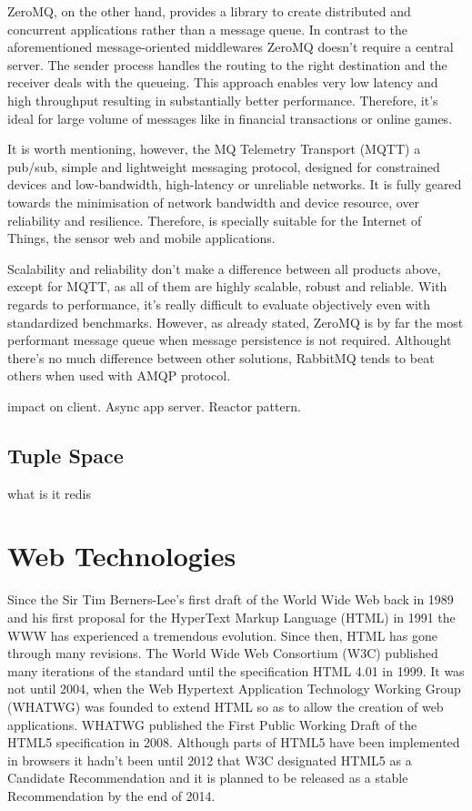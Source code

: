 ZeroMQ, on the other hand, provides a library to create distributed and concurrent applications rather than a message queue. In contrast to the aforementioned message-oriented middlewares ZeroMQ doesn't require a central server. The sender process handles the routing to the right destination and the receiver deals with the queueing. This approach enables very low latency and high throughput resulting in substantially better performance. Therefore, it's ideal for large volume of messages like in financial transactions or online games.

It is worth mentioning, however, the MQ Telemetry Transport (MQTT) a pub/sub, simple and lightweight messaging protocol, designed for constrained devices and low-bandwidth, high-latency or unreliable networks. It is fully geared towards the minimisation of network bandwidth and device resource, over reliability and resilience. Therefore, is specially suitable for the Internet of Things, the sensor web and mobile applications.

Scalability and reliability don't make a difference between all products above, except for MQTT, as all of them are highly scalable, robust and reliable. With regards to performance, it's really difficult to evaluate objectively even with standardized benchmarks. However, as already stated, ZeroMQ is by far the most performant message queue when message persistence is not required. Althought there's no much difference between other solutions, RabbitMQ tends to beat others when used with AMQP protocol.

impact on client. Async app server. Reactor pattern.

\subsection{Tuple Space}
what is it
redis

\section{Web Technologies}

Since the Sir Tim Berners-Lee's first draft of the World Wide Web back in 1989 and his first proposal for the HyperText Markup Language (HTML) \cite{HTMLtags} in 1991 the WWW has experienced a tremendous evolution. Since then, HTML has gone through many revisions. The World Wide Web Consortium (W3C) published many iterations of the standard until the specification HTML 4.01 in 1999. It was not until 2004, when the Web Hypertext Application Technology Working Group (WHATWG) was founded to extend HTML so as to allow the creation of web applications. WHATWG published the First Public Working Draft of the HTML5 specification in 2008. Although parts of HTML5 have been implemented in browsers it hadn't been until 2012 that W3C designated HTML5 as a Candidate Recommendation and it is planned to be released as a stable Recommendation by the end of 2014.

